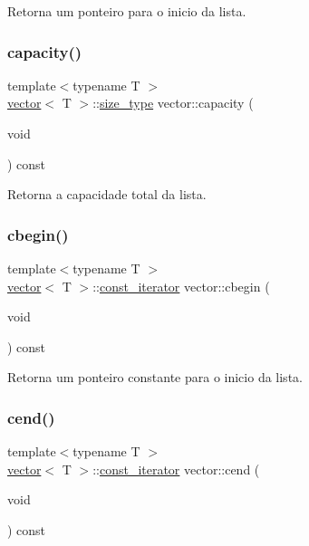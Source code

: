 Retorna um ponteiro para o inicio da lista. 

\mbox{\label{classsc_1_1vector_acf5f0cebfb797dac6eb42523d1e7511a}} 
\subsubsection{\texorpdfstring{capacity()}{capacity()}}
{\footnotesize\ttfamily template$<$typename T $>$ \\
\hyperlink{classsc_1_1vector}{vector}$<$ T $>$\+::\hyperlink{classsc_1_1vector_a48bf37ba1a6d0c13504414d86e27c399}{size\+\_\+type} vector\+::capacity (\begin{DoxyParamCaption}\item[{void}]{ }\end{DoxyParamCaption}) const}



Retorna a capacidade total da lista. 

\mbox{\label{classsc_1_1vector_abf97464250caf4653a104fff421943c8}} 
\subsubsection{\texorpdfstring{cbegin()}{cbegin()}}
{\footnotesize\ttfamily template$<$typename T $>$ \\
\hyperlink{classsc_1_1vector}{vector}$<$ T $>$\+::\hyperlink{classsc_1_1vector_a1e50aa429ea9de6ead4bfdb8614c1c9a}{const\+\_\+iterator} vector\+::cbegin (\begin{DoxyParamCaption}\item[{void}]{ }\end{DoxyParamCaption}) const}



Retorna um ponteiro constante para o inicio da lista. 

\mbox{\label{classsc_1_1vector_aa6a2e50e9f3eec904cf6ec0f357c8180}} 
\subsubsection{\texorpdfstring{cend()}{cend()}}
{\footnotesize\ttfamily template$<$typename T $>$ \\
\hyperlink{classsc_1_1vector}{vector}$<$ T $>$\+::\hyperlink{classsc_1_1vector_a1e50aa429ea9de6ead4bfdb8614c1c9a}{const\+\_\+iterator} vector\+::cend (\begin{DoxyParamCaption}\item[{void}]{ }\end{DoxyParamCaption}) const}



